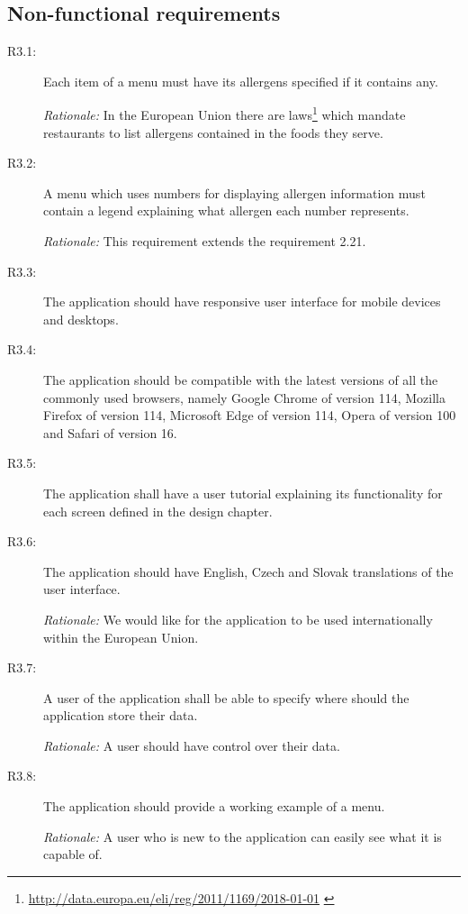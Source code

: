 \subsection{Non-functional requirements}

\begin{description}
    \item [R3.1:] Each item of a menu must have its allergens specified if it contains any.
    
    \emph{Rationale:} In the European Union there are laws\footnote{\url{http://data.europa.eu/eli/reg/2011/1169/2018-01-01}  \label{fnlabel}} which mandate restaurants to list allergens contained in the foods they serve.
    \item [R3.2:] A menu which uses numbers for displaying allergen information must contain a legend explaining what allergen each number represents.

    \emph{Rationale:} This requirement extends the requirement 2.21.
    \item [R3.3:] The application should have responsive user interface for mobile devices and desktops.
    \item [R3.4:] The application should be compatible with the latest versions of all the commonly used browsers, namely Google Chrome of version 114, Mozilla Firefox of version 114, Microsoft Edge of version 114, Opera of version 100 and Safari of version 16.
    \item [R3.5:] The application shall have a user tutorial explaining its functionality for each screen defined in the design chapter.
    \item [R3.6:] The application should have English, Czech and Slovak translations of the user interface.

    \emph{Rationale:} We would like for the application to be used internationally within the European Union.
    \item [R3.7:] A user of the application shall be able to specify where should the application store their data.

    \emph{Rationale:} A user should have control over their data.
    \item [R3.8:] The application should provide a working example of a menu.

    \emph{Rationale:} A user who is new to the application can easily see what it is capable of.
\end{description}

\vspace*{\fill}